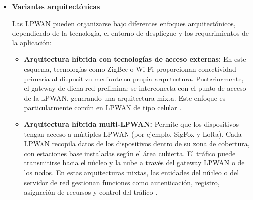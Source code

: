 \begin{itemize}
\begin{itemize}
                  \item \textbf{Servidor LPWAN y servidores de aplicación:} El
                        servidor  LPWAN  se   encarga   del   aprovisionamiento,
                        registro y operación de las entidades de la  red.  Puede
                        compartir  o  ampliar  funcionalidades  esenciales   del
                        núcleo como el  enrutamiento  de  tráfico,  seguridad  y
                        manejo de prioridades. Los servidores de aplicación y la
                        nube  gestionan  la  base  de  datos  que  almacena  los
                        mensajes recibidos de  los  dispositivos  conectados,  y
                        pueden  analizar  y  actuar  sobre  los  datos  mediante
                        técnicas de análisis de grandes volúmenes de información
                        \parencite[]{chilamkurthy2022low}.

            \end{itemize}

      \item \textbf{Variantes arquitectónicas}

            Las   LPWAN   pueden   organizarse    bajo    diferentes    enfoques
            arquitectónicos,  dependiendo  de  la  tecnología,  el  entorno   de
            despliegue y los requerimientos de la aplicación:

            \begin{itemize}

                  \item \textbf{Arquitectura híbrida con tecnologías de acceso
                              externas:} En este
                        esquema, tecnologías como ZigBee  o  Wi-Fi  proporcionan
                        conectividad primaria al dispositivo mediante su  propia
                        arquitectura. Posteriormente, el gateway  de  dicha  red
                        preliminar se interconecta con el punto de acceso de  la
                        LPWAN, generando una arquitectura mixta. Este enfoque es
                        particularmente  común  en   LPWAN   de   tipo   celular
                        \parencite[]{chilamkurthy2022low}.

                  \item \textbf{Arquitectura híbrida multi-LPWAN:} Permite que
                        los dispositivos tengan acceso a  múltiples  LPWAN  (por
                        ejemplo, SigFox y LoRa). Cada LPWAN  recopila  datos  de
                        los dispositivos dentro de su  zona  de  cobertura,  con
                        estaciones base instaladas según el  área  cubierta.  El
                        tráfico puede transmitirse hacia el núcleo y la  nube  a
                        través del gateway  LPWAN  o  de  los  nodos.  En  estas
                        arquitecturas mixtas, las entidades  del  núcleo  o  del
                        servidor de red gestionan funciones como  autenticación,
                        registro, asignación de recursos y control  del  tráfico
                        \parencite[]{chilamkurthy2022low}.


\end{itemize}
\end{itemize}

